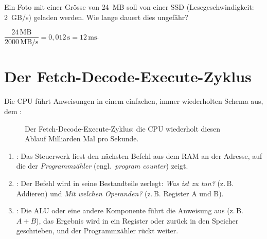 \begin{myexercise}
    Ein Foto mit einer Grösse von 24~MB soll von einer SSD (Lesegeschwindigkeit: 2~GB/s) geladen werden. Wie lange dauert dies ungefähr?
    \begin{myanswer}
        $\dfrac{24\,\mathrm{MB}}{2000\,\mathrm{MB/s}} = 0{,}012\,\mathrm{s} = 12\,\mathrm{ms}$.
    \end{myanswer}
\end{myexercise}

\section{Der Fetch-Decode-Execute-Zyklus}\label{sec:fde}

Die CPU führt Anweisungen in einem einfachen, immer wiederholten Schema aus, dem :

\begin{figure}[H]
    \centering
    \caption{Der Fetch-Decode-Execute-Zyklus: die CPU wiederholt diesen Ablauf Milliarden Mal pro Sekunde.}
    \label{fig:fde}
\end{figure}

\begin{enumerate}
    \item {}: Das Steuerwerk liest den nächsten Befehl aus dem RAM an der Adresse, auf die der \emph{Programmzähler} (engl.\ \emph{program counter}) zeigt.
    \item {}: Der Befehl wird in seine Bestandteile zerlegt: \emph{Was ist zu tun?} (z.\,B. Addieren) und \emph{Mit welchen Operanden?} (z.\,B. Register A und B).
    \item {}: Die ALU oder eine andere Komponente führt die Anweisung aus (z.\,B. $A + B$), das Ergebnis wird in ein Register oder zurück in den Speicher geschrieben, und der Programmzähler rückt weiter.
\end{enumerate}

